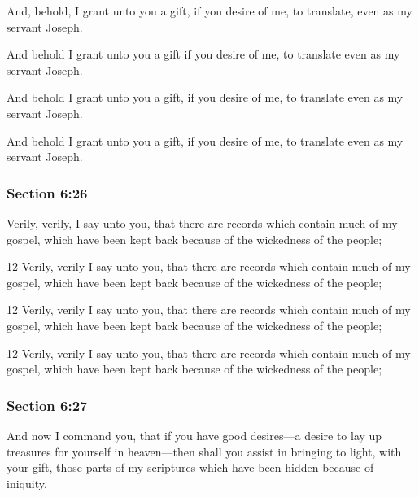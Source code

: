 		And, behold, I grant unto you a gift, if you desire of me, to translate, even as my servant Joseph.

		\begin{framed}
		\scriptsize
			\begin{compactdesc}
				\item[JSP] And behold I grant unto you a gift if you desire of me, to translate even as my servant Joseph.
				\item[DC 1835] And behold I grant unto you a gift, if you desire of me, to translate even as my servant Joseph.
				\item[DC 1844] And behold I grant unto you a gift, if you desire of me, to translate even as my servant Joseph.
			\end{compactdesc}
		\end{framed}

	\subsubsection{Section 6:26} %
		\label{DC6-26}

		Verily, verily, I say unto you, that there are records which contain much of my gospel, which have been kept back because of the wickedness of the people;

		\begin{framed}
		\scriptsize
			\begin{compactdesc}
				\item[JSP] 12 Verily, verily I say unto you, that there are records which contain much of my gospel, which have been kept back because of the wickedness of the people;
				\item[DC 1835] 12 Verily, verily I say unto you, that there are records which contain much of my gospel, which have been kept back because of the wickedness of the people;
				\item[DC 1844] 12 Verily, verily I say unto you, that there are records which contain much of my gospel, which have been kept back because of the wickedness of the people; 
			\end{compactdesc}
		\end{framed}

	\subsubsection{Section 6:27} %
		\label{DC6-27}

		And now I command you, that if you have good desires---a desire to lay up treasures for yourself in heaven---then shall you assist in bringing to light, with your gift, those parts of my scriptures which have been hidden because of iniquity.

